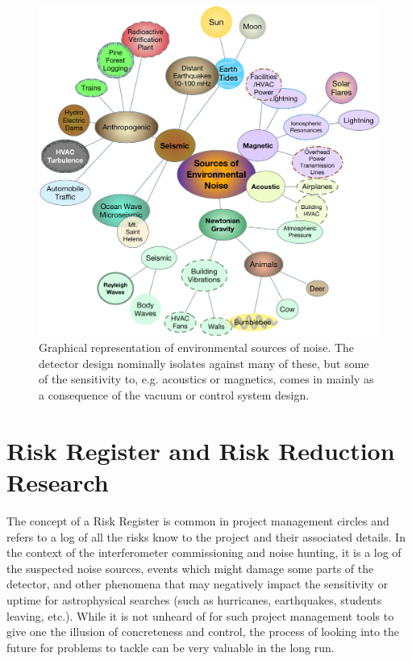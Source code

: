 \begin{figure}[t]
\centering
\includegraphics[width=\columnwidth]{Figures/Environmental.pdf}
\caption{Graphical representation of environmental sources of noise. The detector
design nominally isolates against many of these, but some of the sensitivity to,
e.g. acoustics or magnetics, comes in mainly as a consequence of the vacuum
or control system design.}
\label{fig:EnvironmentalNoise}
\end{figure}


\section{Risk Register and Risk Reduction Research}
\label{s:IDC:Risk}
The concept of a Risk Register is common in project management circles and refers
to a log of all the risks know to the project and their associated details. In
the context of the interferometer commissioning and noise hunting, it is a log of
the suspected noise sources, events which might damage some parts of the detector,
and other phenomena that may negatively impact the sensitivity or uptime for
astrophysical searches (such as hurricanes, earthquakes, students leaving, etc.).
While it is not unheard of for such project management tools to give one the
illusion of concreteness and control, the process of looking into the future
for problems to tackle can be very valuable in the long run.

